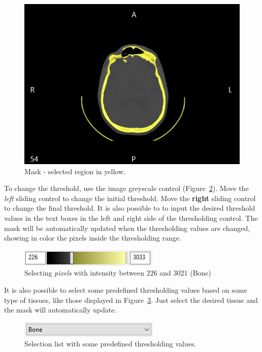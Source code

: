 \begin{figure}[!htb]
\centering
\includegraphics[scale=0.4]{../user_guide_figures/invesalius_screen/segmentation_threshold_axial_en.png}
\caption{Mask - selected region in yellow.}
\label{fig:region_selection_masc}
\end{figure}

To change the threshold, use the image greyscale control (Figure~\ref{fig:region_selection_bar}). Move the \textit{left} sliding control to change the initial threshold. Move the \textbf{right} sliding control to change the final threshold. It is also possible to to input the desired threshold values in the text boxes in
the left and right side of the thresholding control. The mask will be automatically updated when the thresholding values are changed, showing in color the pixels inside the thresholding range.


\begin{figure}[!htb]
\centering
\includegraphics[scale=0.75]{../user_guide_figures/invesalius_screen/segmentation_threshold_bar.png}
\caption{Selecting \textit{pixels} with intensity between $226$ and $3021$ (Bone)}
\label{fig:region_selection_bar}
\end{figure}

It is also possible to select some predefined thresholding values based on some type of tissues, like those displayed in Figure~\ref{fig:limiar_presets}. Just select the desired tissue and the mask will automatically update.

\begin{figure}[!htb]
\centering
\includegraphics[scale=0.65]{../user_guide_figures/invesalius_screen/segmentation_threshold_presets_en.png}
\caption{Selection list with some predefined thresholding values.}
\label{fig:limiar_presets}
\end{figure}

